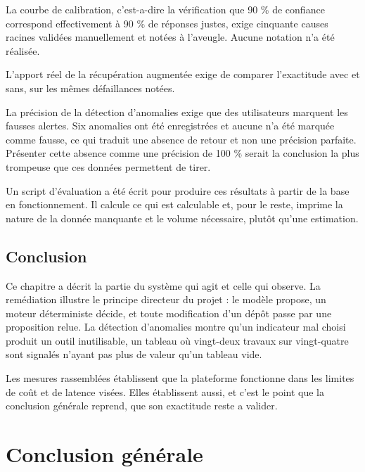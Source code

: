 \documentclass[12pt,a4paper,oneside]{report}
\begin{document}
La courbe de calibration, c'est-a-dire la vérification que 90 \% de confiance
correspond effectivement à 90 \% de réponses justes, exige cinquante causes
racines validées manuellement et notées à l'aveugle. Aucune notation n'a été
réalisée.

L'apport réel de la récupération augmentée exige de comparer l'exactitude avec et
sans, sur les mêmes défaillances notées.

La précision de la détection d'anomalies exige que des utilisateurs marquent les
fausses alertes. Six anomalies ont été enregistrées et aucune n'a été marquée
comme fausse, ce qui traduit une absence de retour et non une précision parfaite.
Présenter cette absence comme une précision de 100 \% serait la conclusion la plus
trompeuse que ces données permettent de tirer.

Un script d'évaluation a été écrit pour produire ces résultats à partir de la base
en fonctionnement. Il calcule ce qui est calculable et, pour le reste, imprime la
nature de la donnée manquante et le volume nécessaire, plutôt qu'une estimation.

\section*{Conclusion}

Ce chapitre a décrit la partie du système qui agit et celle qui observe. La
remédiation illustre le principe directeur du projet : le modèle propose, un
moteur déterministe décide, et toute modification d'un dépôt passe par une
proposition relue. La détection d'anomalies montre qu'un indicateur mal choisi
produit un outil inutilisable, un tableau où vingt-deux travaux sur vingt-quatre
sont signalés n'ayant pas plus de valeur qu'un tableau vide.

Les mesures rassemblées établissent que la plateforme fonctionne dans les limites
de coût et de latence visées. Elles établissent aussi, et c'est le point que la
conclusion générale reprend, que son exactitude reste a valider.

\clearpage

\chapter*{Conclusion générale}
\end{document}

